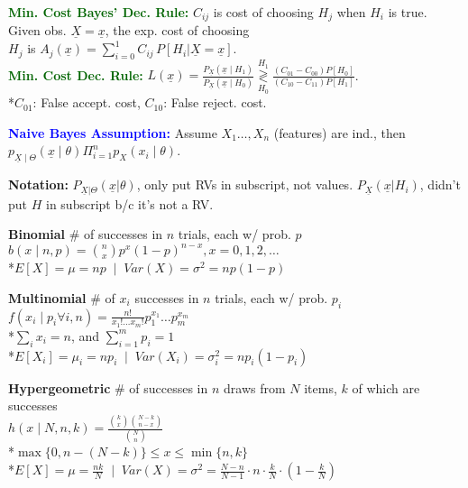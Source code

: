 \documentclass[5pt]{extarticle} %
\begin{document}
\begin{paracol}{3}
{    \textcolor{darkgreen}{\textbf{Min. Cost Bayes' Dec. Rule:}} $C_{ij}$ is cost of choosing $H_j$ when $H_i$ is true. Given obs. $\underline{X} = \underline{x}$, the exp. cost of choosing \\ 
    $H_j$ is $A_j (\underline{x}) = \sum_{i=0}^1 C_{ij} \, P[H_i | \underline{X} = \underline{x}]$. \\
    

    \textcolor{darkgreen}{\textbf{Min. Cost Dec. Rule:}} 
    $L(\underline{x}) = \frac{P_{\underline{X}} (\underline{x} \mid H_1)}{P_{\underline{X}} (\underline{x} \mid H_0)}\overset{H_1}{\underset{H_0}{\gtrless}} \frac{(C_{01} - C_{00}) P[H_0]}{(C_{10} - C_{11})P[H_1]}$. \\
    *$C_{01}$: False accept. cost, $C_{10}$: False reject. cost.

    \textcolor{blue}{\textbf{Naive Bayes Assumption:}} Assume $X_1 \ldots, X_n$ (features) are ind., then $p_{\underline{X} \mid \Theta} (\underline{x} \mid \theta) \Pi_{i=1}^n p_X (x_i \mid \theta)$.

    \textbf{Notation:} $P_{\underline{X} | \Theta} (\underline{x} | \theta)$, only put RVs in subscript, not values. $P_{\underline{X}} (\underline{x} | H_i)$, didn't put $H$ in subscript b/c it's not a RV.

    \textbf{Binomial} \# of successes in $n$ trials, each w/ prob. $p$ \\
    $ b(x \mid n, p) = \binom{n}{x} p^x (1 - p)^{n - x}, x = 0, 1, 2, \dots $ \\
    *$ E[X] = \mu = np \; \mid \; Var(X) = \sigma^2 = np(1 - p) $

    \textbf{Multinomial} \# of $x_i$ successes in $n$ trials, each w/ prob. $p_i$ \\
    $ f(x_i \mid p_i \forall i, n) = \frac{n!}{x_1! \dots x_m!} p_1^{x_1} \dots p_m^{x_m} $  \\
    *$ \sum_{i} x_i = n $, and $ \sum_{i=1}^{m} p_i = 1 $ \\
    *$ E[X_i] = \mu_i = np_i \; \mid \; Var(X_i) = \sigma^2_i = np_i(1 - p_i) $

    \textbf{Hypergeometric} \# of successes in $n$ draws from $N$ items, $k$ of which are successes \\
    $ h(x \mid N, n, k) = \frac{\binom{k}{x} \binom{N-k}{n-x}}{\binom{N}{n}}$ \\
    *$\max\{0, n - (N - k)\} \leq x \leq \min\{n, k\} $ \\
    *$E[X] = \mu = \frac{nk}{N} \; \mid \; Var(X) = \sigma^2 = \frac{N-n}{N-1} \cdot n \cdot \frac{k}{N} \cdot \left(1 - \frac{k}{N} \right) $

}
\end{paracol}
\end{document}

